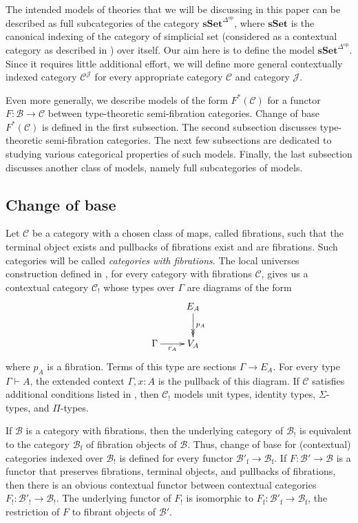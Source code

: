 \documentclass[reqno]{amsart}
\theoremstyle{definition}
\theoremstyle{remark}
\newcommand{\fs}[1]{\mathrm{#1}}
\newcommand{\cat}[1]{\mathbf{#1}}
\newcommand{\scat}[1]{\mathcal{#1}}
\newcommand{\sSet}{\cat{sSet}}
\numberwithin{figure}{section}
\begin{document}
The intended models of theories that we will be discussing in this paper can be described as full subcategories of the category $\sSet^{\Delta^\fs{op}}$,
where $\sSet$ is the canonical indexing of the category of simplicial set (considered as a contextual category as described in \cite{kap-lum-voe}) over itself.
Our aim here is to define the model $\sSet^{\Delta^\fs{op}}$.
Since it requires little additional effort, we will define more general contextually indexed category $\scat{C}^\scat{J}$ for every appropriate category $\scat{C}$ and category $\scat{J}$.

Even more generally, we describe models of the form $F^*(\scat{C})$ for a functor $F : \scat{B} \to \scat{C}$ between type-theoretic semi-fibration categories.
Change of base $F^*(\scat{C})$ is defined in the first subsection.
The second subsection discusses type-theoretic semi-fibration categories.
The next few subsections are dedicated to studying various categorical properties of such models.
Finally, the last subsection discusses another class of models, namely full subcategories of models.

\subsection{Change of base}

Let $\scat{C}$ be a category with a chosen class of maps, called fibrations, such that the terminal object exists and pullbacks of fibrations exist and are fibrations.
Such categories will be called \emph{categories with fibrations}.
The local universes construction defined in \cite{local-universes}, for every category with fibrations $\scat{C}$,
gives us a contextual category $\scat{C}_!$ whose types over $\Gamma$ are diagrams of the form
\[ \xymatrix{                       & E_A \ar@{->>}[d]^{p_A} \\
              \Gamma \ar[r]_-{r_A}  & V_A
            } \]
where $p_A$ is a fibration.
Terms of this type are sections $\Gamma \to E_A$.
For every type $\Gamma \vdash A$, the extended context $\Gamma, x : A$ is the pullback of this diagram.
If $\scat{C}$ satisfies additional conditions listed in \cite[Definition~4.2.1]{local-universes}, then $\scat{C}_!$ models unit types, identity types, $\Sigma$-types, and $\Pi$-types.

If $\scat{B}$ is a category with fibrations, then the underlying category of $\scat{B}_!$ is equivalent to the category $\scat{B}_\fs{f}$ of fibration objects of $\scat{B}$.
Thus, change of base for (contextual) categories indexed over $\scat{B}_!$ is defined for every functor $\scat{B}'_\fs{f} \to \scat{B}_\fs{f}$.
If $F : \scat{B}' \to \scat{B}$ is a functor that preserves fibrations, terminal objects, and pullbacks of fibrations, then there is an obvious contextual functor between contextual categories $F_! : \scat{B}'_! \to \scat{B}_!$.
The underlying functor of $F_!$ is isomorphic to $F_\fs{f} : \scat{B}'_\fs{f} \to \scat{B}_\fs{f}$, the restriction of $F$ to fibrant objects of $\scat{B}'$.
\end{document}

